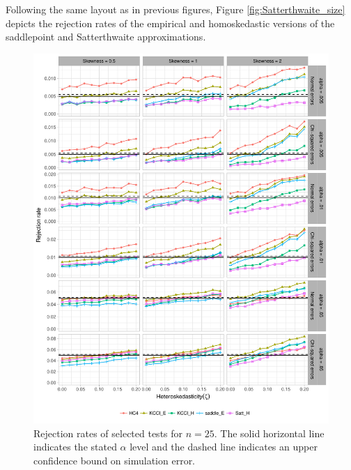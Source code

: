 \documentclass[12pt]{article}\usepackage[]{graphicx}\usepackage[]{color}
\newenvironment{knitrout}{}{} %
\begin{document}
Following the same layout as in previous figures, Figure \ref{fig:Satterthwaite_size} depicts the rejection rates of the empirical and homoskedastic versions of the saddlepoint and Satterthwaite approximations. 

\begin{knitrout}
\color{fgcolor}\begin{figure}[p]

{\centering \includegraphics[width=\linewidth]{HC_fig/selected_size_25-1} 

}

\caption[Rejection rates of selected tests for $n = 25$]{Rejection rates of selected tests for $n = 25$. The solid horizontal line indicates the stated $\alpha$ level and the dashed line indicates an upper confidence bound on simulation error.}\label{fig:selected_size_25}
\end{figure}


\end{knitrout}
\end{document}
